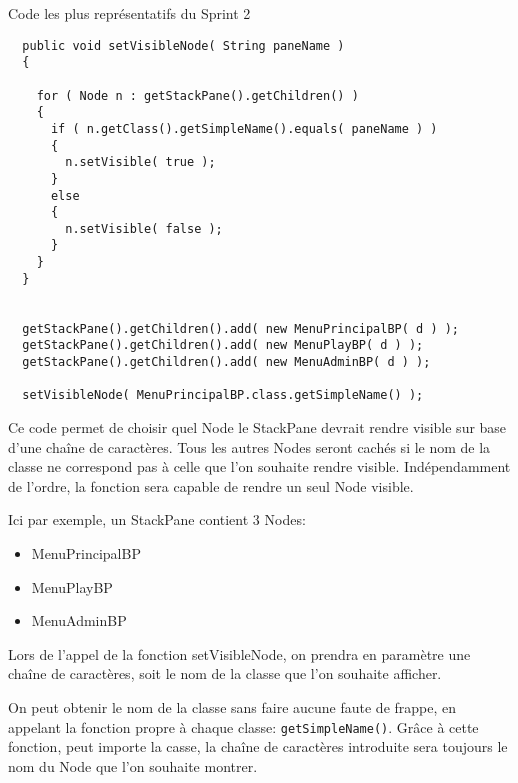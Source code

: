 Code les plus représentatifs du Sprint 2
\begin{lstlisting}
  public void setVisibleNode( String paneName )
  {

    for ( Node n : getStackPane().getChildren() )
    {
      if ( n.getClass().getSimpleName().equals( paneName ) )
      {
        n.setVisible( true );
      }
      else
      {
        n.setVisible( false );
      }
    }
  }
  

  getStackPane().getChildren().add( new MenuPrincipalBP( d ) );
  getStackPane().getChildren().add( new MenuPlayBP( d ) );
  getStackPane().getChildren().add( new MenuAdminBP( d ) );

  setVisibleNode( MenuPrincipalBP.class.getSimpleName() );
\end{lstlisting}

Ce code permet de choisir quel Node le StackPane devrait rendre visible sur base d'une chaîne de caractères.
Tous les autres Nodes seront cachés si le nom de la classe ne correspond pas à celle que l'on souhaite rendre visible.
Indépendamment de l'ordre, la fonction sera capable de rendre un seul Node visible.

Ici par exemple, un StackPane contient 3 Nodes:
\begin{itemize}
\item MenuPrincipalBP
\item MenuPlayBP
\item MenuAdminBP
\end{itemize}

Lors de l'appel de la fonction setVisibleNode, on prendra en paramètre une chaîne de caractères, soit le nom de la classe que l'on souhaite afficher.

On peut obtenir le nom de la classe sans faire aucune faute de frappe, en appelant la fonction propre à chaque classe: \verb|getSimpleName()|.
Grâce à cette fonction, peut importe la casse, la chaîne de caractères introduite sera toujours le nom du Node que l'on souhaite montrer.
